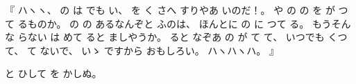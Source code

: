 %
『
ハヽヽ、
%
の
は
でも
い、
%
を
く
さへ
すりやあ
いのだ！。
%
や%
の%
の
を
が
つて
るものか。
%
の
の
あるなんぞと
ふのは、
%
ほんとに
の
に
つて
る。
%
もうそんな
らない
は
めて
ると
ましやうか。
%
ると
なぞあ
の
が
て
て、
%
いつでも
くつて、
%
て
ないで、
%
いゝ%
ですから
おもしろい。
%
ハヽハヽハ。
』

%
と
ひして
を
かしぬ。
